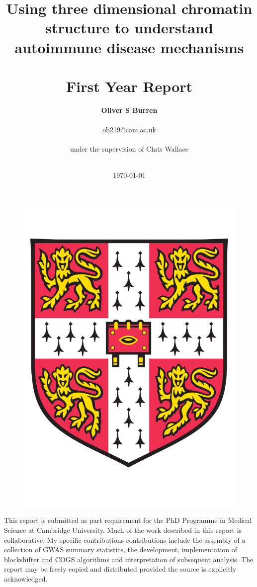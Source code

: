 \documentclass[a4paper,11pt]{report}
\title{\huge \textbf{Using three dimensional chromatin structure to understand autoimmune disease mechanisms} \\
\textbf{} \\
First Year Report}
\author{ \LARGE
 \textbf{Oliver S Burren}\\ \\
\LARGE \url{ob219@cam.ac.uk}\\ \\
\LARGE under the supervision of Chris Wallace \\ \\
}
\date{\huge \today}
\begin{document}
\begin{figure}
\centering
\includegraphics[width=0.3\linewidth]{UniCam.pdf}
\end{figure}




\maketitle

\thispagestyle{empty} 
\begin{small}
This report is submitted as part requirement for the  PhD Programme in Medical Science at Cambridge University. Much of the work described in this report is collaborative. My specific contributions contributions include the assembly of a collection of GWAS summary statistics, the  development, implementation of blockshifter and COGS algorithms and interpretation of subsequent analysis.
The report may be freely copied and distributed provided the source is explicitly acknowledged.
\end{small}

\clearpage

\singlespacing
\end{document}
